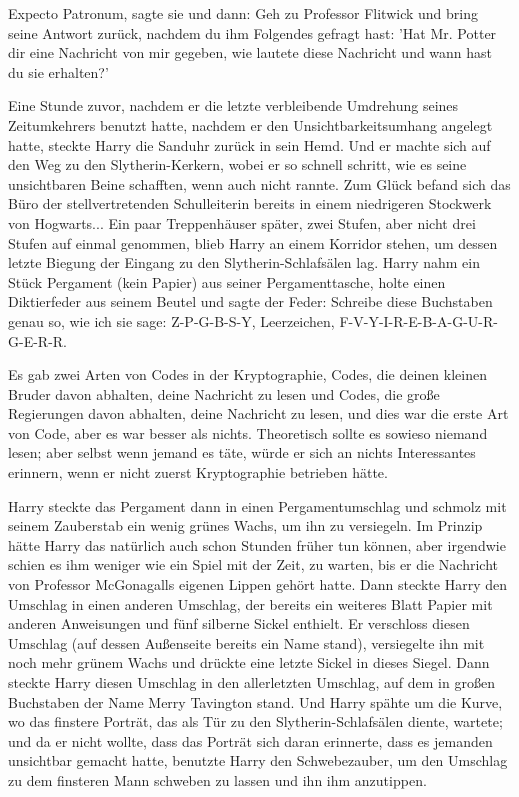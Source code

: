 \glqq Expecto Patronum\grqq{}, sagte sie und dann: \glqq Geh zu Professor
Flitwick und bring seine Antwort zurück, nachdem du ihm Folgendes gefragt hast:
'Hat Mr. Potter dir eine Nachricht von mir gegeben, wie lautete diese Nachricht
und wann hast du sie erhalten?'\grqq{}

Eine Stunde zuvor, nachdem er die letzte verbleibende Umdrehung seines
Zeitumkehrers benutzt hatte, nachdem er den Unsichtbarkeitsumhang angelegt
hatte, steckte Harry die Sanduhr zurück in sein Hemd. Und er machte sich auf den
Weg zu den Slytherin-Kerkern, wobei er so schnell schritt, wie es seine
unsichtbaren Beine schafften, wenn auch nicht rannte. Zum Glück befand sich das
Büro der stellvertretenden Schulleiterin bereits in einem niedrigeren Stockwerk
von Hogwarts... Ein paar Treppenhäuser später, zwei Stufen, aber nicht drei
Stufen auf einmal genommen, blieb Harry an einem Korridor stehen, um dessen
letzte Biegung der Eingang zu den Slytherin-Schlafsälen lag. Harry nahm ein
Stück Pergament (kein Papier) aus seiner Pergamenttasche, holte einen
Diktierfeder aus seinem Beutel und sagte der Feder: \glqq Schreibe diese
Buchstaben genau so, wie ich sie sage: Z-P-G-B-S-Y, Leerzeichen,
F-V-Y-I-R-E-B-A-G-U-R-G-E-R-R.\grqq{}

Es gab zwei Arten von Codes in der Kryptographie, Codes, die deinen kleinen
Bruder davon abhalten, deine Nachricht zu lesen und Codes, die große Regierungen
davon abhalten, deine Nachricht zu lesen, und dies war die erste Art von Code,
aber es war besser als nichts. Theoretisch sollte es sowieso niemand lesen; aber
selbst wenn jemand es täte, würde er sich an nichts Interessantes erinnern, wenn
er nicht zuerst Kryptographie betrieben hätte.

Harry steckte das Pergament dann in einen Pergamentumschlag und schmolz mit
seinem Zauberstab ein wenig grünes Wachs, um ihn zu versiegeln. Im Prinzip hätte
Harry das natürlich auch schon Stunden früher tun können, aber irgendwie schien
es ihm weniger wie ein Spiel mit der Zeit, zu warten, bis er die Nachricht von
Professor McGonagalls eigenen Lippen gehört hatte. Dann steckte Harry den
Umschlag in einen anderen Umschlag, der bereits ein weiteres Blatt Papier mit
anderen Anweisungen und fünf silberne Sickel enthielt. Er verschloss diesen
Umschlag (auf dessen Außenseite bereits ein Name stand), versiegelte ihn mit
noch mehr grünem Wachs und drückte eine letzte Sickel in dieses Siegel. Dann
steckte Harry diesen Umschlag in den allerletzten Umschlag, auf dem in großen
Buchstaben der Name \glqq Merry Tavington\grqq{} stand. Und Harry spähte um die
Kurve, wo das finstere Porträt, das als Tür zu den Slytherin-Schlafsälen diente,
wartete; und da er nicht wollte, dass das Porträt sich daran erinnerte, dass es
jemanden unsichtbar gemacht hatte, benutzte Harry den Schwebezauber, um den
Umschlag zu dem finsteren Mann schweben zu lassen und ihn ihm anzutippen.

